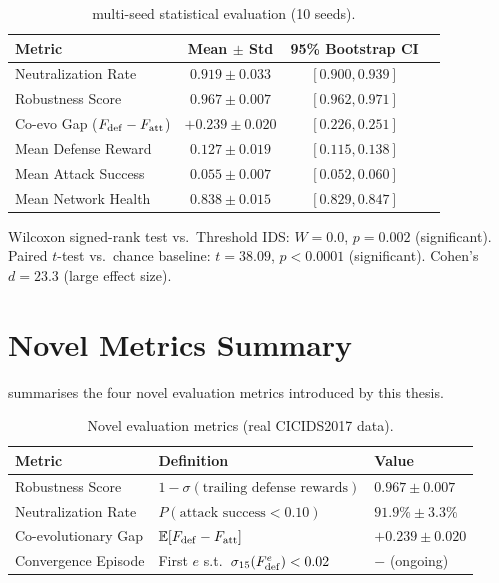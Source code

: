 \begin{table}[htbp]
  \centering
  \caption{\caesar{} multi-seed statistical evaluation (10 seeds).}
  \label{tab:statistical}
  \begin{tabular}{@{} l ccc @{}}
    \toprule
    Metric & Mean $\pm$ Std & 95\% Bootstrap CI \\
    \midrule
    Neutralization Rate     & $0.919 \pm 0.033$ & $[0.900, 0.939]$ \\
    Robustness Score        & $0.967 \pm 0.007$ & $[0.962, 0.971]$ \\
    Co-evo Gap ($F_{\mathrm{def}} - F_{\mathrm{att}}$) & $+0.239 \pm 0.020$ & $[0.226, 0.251]$ \\
    Mean Defense Reward     & $0.127 \pm 0.019$ & $[0.115, 0.138]$ \\
    Mean Attack Success     & $0.055 \pm 0.007$ & $[0.052, 0.060]$ \\
    Mean Network Health     & $0.838 \pm 0.015$ & $[0.829, 0.847]$ \\
    \bottomrule
  \end{tabular}

  \vspace{0.3em}
  \noindent\small
  Wilcoxon signed-rank test vs.\ Threshold IDS: $W = 0.0$, $p = 0.002$ (significant).
  Paired $t$-test vs.\ chance baseline: $t = 38.09$, $p < 0.0001$ (significant).
  Cohen's $d = 23.3$ (large effect size).
\end{table}

\section{\caesar{} Novel Metrics Summary}

 summarises the four novel evaluation metrics
introduced by this thesis.

\begin{table}[htbp]
  \centering
  \caption{Novel \caesar{} evaluation metrics (real CICIDS2017 data).}
  \label{tab:novel_metrics}
  \begin{tabular}{@{} lll @{}}
    \toprule
    Metric & Definition & Value \\
    \midrule
    Robustness Score & $1 - \sigma(\text{trailing defense rewards})$ & $0.967 \pm 0.007$ \\
    Neutralization Rate & $P(\text{attack success} < 0.10)$ & $91.9\% \pm 3.3\%$ \\
    Co-evolutionary Gap & $\mathbb{E}[F_{\mathrm{def}} - F_{\mathrm{att}}]$ & $+0.239 \pm 0.020$ \\
    Convergence Episode & First $e$ s.t.\ $\sigma_{15}(F_{\mathrm{def}}^e) < 0.02$ & $-$ (ongoing) \\
    \bottomrule
  \end{tabular}
\end{table}

